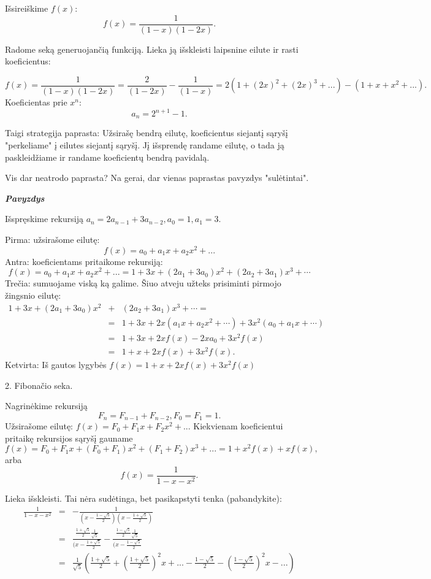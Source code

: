 Išsireiškime $f(x)$: $$f(x)= \frac{1}{(1-x)(1-2x)}.$$

Radome seką generuojančią funkciją. Lieka ją išskleisti laipsnine eilute ir rasti koeficientus:

$$f(x)= \frac{1}{(1-x)(1-2x)} = \frac{2}{(1-2x)} - \frac{1}{(1-x)} = 2(1 + (2x)^2 + (2x)^3 + ...) - (1 + x + x^2 + ...).$$
Koeficientas prie $x^n$: $$a_n = 2^{n+1} - 1.$$

Taigi strategija paprasta: Užsirašę bendrą eilutę, koeficientus siejantį sąryšį "perkeliame" į eilutes siejantį sąryšį. Jį išsprendę randame eilutę, o tada ją paskleidžiame ir randame koeficientų bendrą pavidalą. 

Vis dar neatrodo paprasta? Na gerai, dar vienas paprastas pavyzdys "sulėtintai".

{\bf \itshape Pavyzdys} 

Išspręskime rekursiją $a_n = 2a_{n-1}+3a_{n-2}, a_0 = 1, a_1=3.$

Pirma: užsirašome eilutę: $$f(x) = a_0 + a_1x + a_2x^2 + ...$$
Antra: koeficientams pritaikome rekursiją:
$$f(x) = a_0 + a_1x + a_2x^2 + ... = 1 + 3x + (2a_1 + 3a_0)x^2 + (2a_2 + 3a_1)x^3 + \cdots $$
Trečia: sumuojame viską ką galime. Šiuo atveju užteks prisiminti pirmojo žingsnio eilutę:
\begin{eqnarray*}
1 + 3x + (2a_1 + 3a_0)x^2 &+& (2a_2 + 3a_1)x^3 + \cdots =  \\ &=& 1+3x + 2x(a_1x + a_2x^2 + \cdots) + 3x^2(a_0 + a_1x + \cdots)\\ &=& 1 + 3x + 2xf(x) -2xa_0+ 3x^2f(x) \\ &=&1 + x + 2xf(x) + 3x^2f(x).
\end{eqnarray*}
Ketvirta: Iš gautos lygybės $f(x) = 1 + x + 2xf(x) + 3x^2f(x)$

2. Fibonačio seka.

Nagrinėkime rekursiją $$F_n = F_{n-1} + F_{n-2}, F_{0}=F_{1}=1.$$ Užsirašome eilutę: $f(x) = F_0 + F_1x + F_2x^2 + ...$
Kiekvienam koeficientui pritaikę rekursijos sąryšį gauname  $$f(x)= F_0 + F_1x + (F_0 + F_1)x^2 + (F_1 + F_2)x^3 + ... = 
1 + x^2f(x) + xf(x),$$ arba $$f(x)= \frac{1}{1-x-x^2}.$$

Lieka išskleisti. Tai nėra sudėtinga, bet pasikapstyti tenka (pabandykite):
\begin{eqnarray*}
\frac{1}{1-x-x^2} &=& - \frac{1}{(x-\frac{1-\sqrt{5}}{2})(x-\frac{1+\sqrt{5}}{2})} \\&=& \frac{\frac{1+\sqrt{5}}{2}\frac{1}{\sqrt{5}}}{(x-\frac{1+\sqrt{5}}{2}} - \frac{\frac{1-\sqrt{5}}{2}\frac{1}{\sqrt{5}}}{(x-\frac{1-\sqrt{5}}{2}} \\&=&
\frac{1}{\sqrt{5}}(\frac{1+\sqrt{5}}{2} + \left(\frac{1+\sqrt{5}}{2}\right)^2x + ... - \frac{1-\sqrt{5}}{2} - \left(\frac{1-\sqrt{5}}{2}\right)^2x - ... )
\end{eqnarray*}

